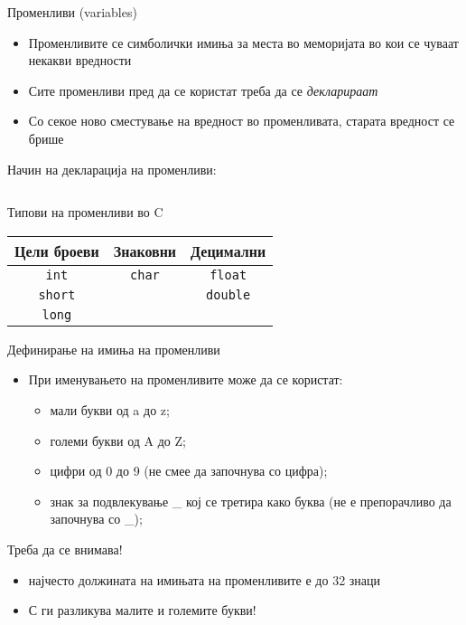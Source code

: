 \begin{frame}{Променливи (variables)}
\begin{itemize}
\item Променливите се симболички имиња за места во меморијата во кои се чуваат некакви вредности
\item Сите променливи пред да се користат треба да се \emph{декларираат}
\item Со секое ново сместување на вредност во променливата, старата вредност се брише
\end{itemize}

Начин на декларација на променливи:
\linebreak
\begin{columns}
         
         
         \fbox{ = }
         
         \fbox{ ; }
\end{columns}   

\end{frame}

\begin{frame}{Типови на променливи во C}
\begin{center}
\begin{Large}
\begin{tabular}{c|c|c}
\textbf{Цели броеви} & \textbf{Знаковни} & \textbf{Децимални}\\
\hline
\texttt{int} & \texttt{char} & \texttt{float} \\
\hline
\texttt{short} & & \texttt{double} \\
\hline
\texttt{long} & &
\end{tabular}
\end{Large}
\end{center}
\end{frame}

\begin{frame}{Дефинирање на имиња на променливи}
\begin{itemize}
\item При именувањето на променливите може да се користат:
\begin{itemize}
\item мали букви од a до z;
\item големи букви од A до Z;
\item цифри од 0 до 9 (не смее да започнува со цифра);
\item знак за подвлекување \_ кој се третира како буква (не е препорачливо да започнува со \_);
\end{itemize}
\end{itemize}
\begin{alertblock}{Треба да се внимава!}
\begin{itemize}
\item најчесто должината на имињата на променливите е до 32 знаци
\item С ги разликува малите и големите букви!
\end{itemize}
\end{alertblock}
\end{frame}

